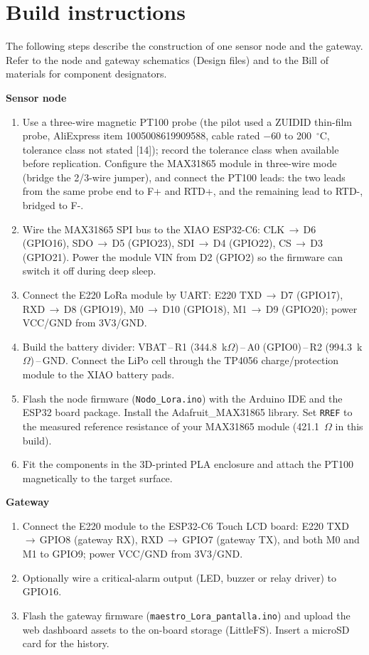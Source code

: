 \documentclass[11pt, letterpaper]{article}
\begin{document}
\section{Build instructions}

The following steps describe the construction of one sensor node and the gateway. Refer to the node and gateway schematics (Design files) and to the Bill of materials for component designators.

\textbf{Sensor node}
\begin{enumerate}[noitemsep]
\item Use a three-wire magnetic PT100 probe (the pilot used a ZUIDID thin-film probe, AliExpress item 1005008619909588, cable rated $-60$ to 200~$^{\circ}$C, tolerance class not stated [14]); record the tolerance class when available before replication. Configure the MAX31865 module in three-wire mode (bridge the 2/3-wire jumper), and connect the PT100 leads: the two leads from the same probe end to F+ and RTD+, and the remaining lead to RTD-, bridged to F-.
\item Wire the MAX31865 SPI bus to the XIAO ESP32-C6: CLK\,$\rightarrow$\,D6 (GPIO16), SDO\,$\rightarrow$\,D5 (GPIO23), SDI\,$\rightarrow$\,D4 (GPIO22), CS\,$\rightarrow$\,D3 (GPIO21). Power the module VIN from D2 (GPIO2) so the firmware can switch it off during deep sleep.
\item Connect the E220 LoRa module by UART: E220 TXD\,$\rightarrow$\,D7 (GPIO17), RXD\,$\rightarrow$\,D8 (GPIO19), M0\,$\rightarrow$\,D10 (GPIO18), M1\,$\rightarrow$\,D9 (GPIO20); power VCC/GND from 3V3/GND.
\item Build the battery divider: VBAT\,--\,R1 (344.8~k$\Omega$)\,--\,A0 (GPIO0)\,--\,R2 (994.3~k$\Omega$)\,--\,GND. Connect the LiPo cell through the TP4056 charge/protection module to the XIAO battery pads.
\item Flash the node firmware (\texttt{Nodo\_Lora.ino}) with the Arduino IDE and the ESP32 board package. Install the Adafruit\_MAX31865 library. Set \texttt{RREF} to the measured reference resistance of your MAX31865 module (421.1~$\Omega$ in this build).
\item Fit the components in the 3D-printed PLA enclosure and attach the PT100 magnetically to the target surface.
\end{enumerate}

\textbf{Gateway}
\begin{enumerate}[noitemsep]
\item Connect the E220 module to the ESP32-C6 Touch LCD board: E220 TXD\,$\rightarrow$\,GPIO8 (gateway RX), RXD\,$\rightarrow$\,GPIO7 (gateway TX), and both M0 and M1 to GPIO9; power VCC/GND from 3V3/GND.
\item Optionally wire a critical-alarm output (LED, buzzer or relay driver) to GPIO16.
\item Flash the gateway firmware (\texttt{maestro\_Lora\_pantalla.ino}) and upload the web dashboard assets to the on-board storage (LittleFS). Insert a microSD card for the history.
\end{enumerate}
\end{document}
